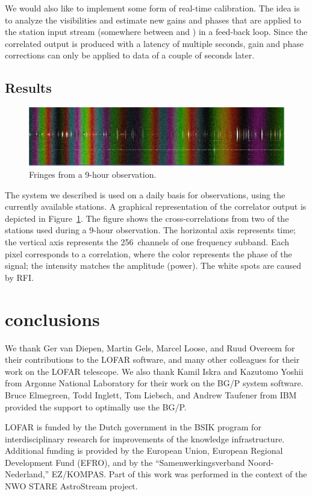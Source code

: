 We would also like to implement some form of real-time calibration.
The idea is to analyze the visibilities and estimate new gains and phases
that are applied to the station input stream (somewhere between
 and ) in a feed-back loop.
Since the correlated output is produced with a latency of multiple seconds,
gain and phase corrections can only be applied to data of a couple of seconds
later.


\subsection{Results}

\begin{figure}[ht]
\includegraphics[width=\columnwidth]{fringe.jpg}
\caption{Fringes from a 9-hour observation.}
\label{fig:fringe}
\end{figure}

The system we described is used on a daily basis for observations, using the
currently available stations.
A graphical representation of the correlator output is depicted in
Figure~\ref{fig:fringe}.
The figure shows the cross-correlations from two of the stations used during a
9-hour observation.
The horizontal axis represents time;
the vertical axis represents the 256~channels of one frequency subband.
Each pixel corresponds to a correlation, where the color represents
the phase of the signal; the intensity matches the amplitude (power).
The white spots are caused by RFI.


\section{conclusions}



\begin{acknowledgements}
We thank Ger van Diepen, Martin Gels, Marcel Loose, and Ruud Overeem
for their contributions to the LOFAR software, and many other colleagues
for their work on the LOFAR telescope.
We also thank Kamil Iskra and Kazutomo Yoshii from Argonne National Laboratory
for their work on the BG/P system software.
Bruce Elmegreen, Todd Inglett, Tom Liebsch, and Andrew Taufener from IBM
provided the support to optimally use the BG/P.

LOFAR is funded by the Dutch government in the BSIK program for
interdisciplinary research for improvements of the knowledge
infrastructure.  Additional funding is provided by the European Union,
European Regional Development Fund (EFRO), and by the
``Samenwerkingsverband Noord-Nederland,'' EZ/KOMPAS. Part of this work was
performed in the context of the NWO STARE AstroStream project.
\end{acknowledgements}


%





